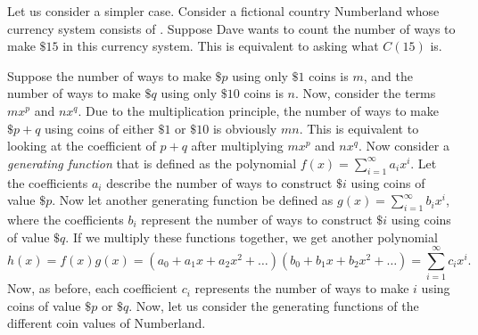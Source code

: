 \documentclass{article}
\begin{document}
Let us consider a simpler case. Consider a fictional country Numberland whose currency system consists of \NTen. Suppose Dave wants to count the number of ways to make  $\$ 15$ in this currency system. This is equivalent to asking what $C(15)$ is.

Suppose the number of ways to make $\$ p$ using only $\$ 1$ coins is $m$, and the number of ways to make $\$ q$ using only $\$ 10$ coins is $n$. Now, consider the terms $mx^{p}$ and $nx^{q}$. Due to the multiplication principle, the number of ways to make $\$ p+q$ using coins of either $\$ 1$ or $\$ 10$ is obviously $mn$. This is equivalent to looking at the coefficient of $p+q$ after multiplying $mx^{p}$ and $nx^{q}$.
Now consider a \emph{generating function} that is defined as the polynomial $f(x) = \sum_{i=1}^{\infty} a_i x^i$. Let the coefficients $a_i$ describe the number of ways to construct $\$ i$ using coins of value $\$ p$. Now let another generating function be defined as $g(x) = \sum_{i=1}^{\infty} b_i x^i$, where the coefficients $b_i$ represent the number of ways to construct $\$ i$ using coins of value $\$ q$. If we multiply these functions together, we get another polynomial \[
  h(x) = f(x)g(x) = (a_0 + a_1x + a_2x^2 + \dots)(b_0 + b_1x + b_2x^2 + \dots) = \sum_{i=1}^{\infty} c_ix^{i}
.\] Now, as before, each coefficient $c_i$ represents the number of ways to make $i$ using coins of value $\$ p$ or $\$ q$. Now, let us consider the generating functions of the different coin values of Numberland.
\end{document}
